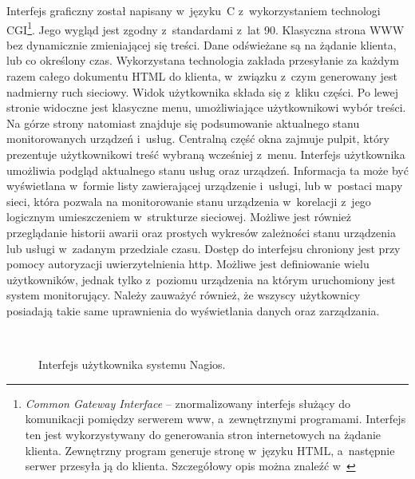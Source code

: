 Interfejs graficzny został napisany w~języku~C z~wykorzystaniem
technologi CGI\footnote{{\em Common Gateway Interface} --
  znormalizowany interfejs służący do komunikacji pomiędzy serwerem
  www, a~zewnętrznymi programami. Interfejs ten jest wykorzystywany do
  generowania stron internetowych na żądanie klienta. Zewnętrzny
  program generuje stronę w~języku HTML, a~następnie serwer przesyła
  ją do klienta. Szczegółowy opis można znaleźć w~\cite{www:CGI}}. Jego wygląd
jest zgodny z~standardami z~lat 90. Klasyczna strona WWW bez
dynamicznie zmieniającej się treści. Dane odświeżane są na żądanie
klienta, lub co określony czas. Wykorzystana technologia zakłada
przesyłanie za każdym razem całego dokumentu HTML do klienta,
w~związku z~czym generowany jest nadmierny ruch sieciowy. Widok
użytkownika składa się z~kliku części. Po lewej stronie widoczne jest
klasyczne menu, umożliwiające użytkownikowi wybór treści. Na górze
strony natomiast znajduje się podsumowanie aktualnego stanu
monitorowanych urządzeń i~usług. Centralną część okna zajmuje pulpit,
który prezentuje użytkownikowi treść wybraną wcześniej
z~menu. Interfejs użytkownika umożliwia podgląd aktualnego stanu usług
oraz urządzeń. Informacja ta może być wyświetlana w~formie listy
zawierającej urządzenie i~usługi, lub w~postaci mapy sieci, która
pozwala na monitorowanie stanu urządzenia w~korelacji z~jego logicznym
umieszczeniem w~strukturze sieciowej. Możliwe jest również
przeglądanie historii awarii oraz prostych wykresów zależności stanu
urządzenia lub usługi w~zadanym przedziale czasu. Dostęp do interfejsu
chroniony jest przy pomocy autoryzacji uwierzytelnienia http. Możliwe
jest definiowanie wielu użytkowników, jednak tylko z~poziomu
urządzenia na którym uruchomiony jest system monitorujący. Należy
zauważyć również, że wszyscy użytkownicy posiadają takie same
uprawnienia do wyświetlania danych oraz zarządzania.

\begin{figure}[h]
\label{fig:NagiosInterface}
\caption{Interfejs użytkownika systemu Nagios.}
\begin{center}
\\[0.1cm]
\end{center}
\end{figure}

